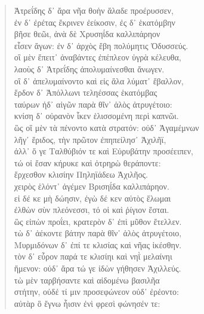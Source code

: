 \begin{Spacing}{1.5}
\begin{verse}
{\large\g Ἀτρεΐδης δ᾽ ἄρα νῆα θοὴν ἅλαδε προέρυσσεν,  } \\
{\large\g ἐν δ᾽ ἐρέτας ἔκρινεν ἐείκοσιν, ἐς δ᾽ ἑκατόμβην  } \\
{\large\g βῆσε θεῶι, ἀνὰ δὲ Χρυσηΐδα καλλιπάρηον  } \\
{\large\g εἷσεν ἄγων: ἐν δ᾽ ἀρχὸς ἔβη πολύμητις Ὀδυσσεύς.  } \\
{\large\g οἳ μὲν ἔπειτ᾽ ἀναβάντες ἐπέπλεον ὑγρὰ κέλευθα,  } \\
{\large\g λαοὺς δ᾽ Ἀτρεΐδης ἀπολυμαίνεσθαι ἄνωγεν.  } \\
{\large\g οἳ δ᾽ ἀπελυμαίνοντο καὶ εἰς ἅλα λύματ᾽ ἔβαλλον,  } \\
{\large\g ἕρδον δ᾽ Ἀπόλλωνι τεληέσσας ἑκατόμβας  } \\
{\large\g ταύρων ἠδ᾽ αἰγῶν παρὰ θῖν᾽ ἁλὸς ἀτρυγέτοιο:  } \\
{\large\g κνίση δ᾽ οὐρανὸν ἷκεν ἑλισσομένη περὶ καπνῶι.  } \\
{\large\g ὣς οἳ μὲν τὰ πένοντο κατὰ στρατόν: οὐδ᾽ Ἀγαμέμνων  } \\
{\large\g λῆγ᾽ ἔριδος, τὴν πρῶτον ἐπηπείλησ᾽ Ἀχιλῆϊ,  } \\
{\large\g ἀλλ᾽ ὅ γε Ταλθύβιόν τε καὶ Εὐρυβάτην προσέειπεν,  } \\
{\large\g τώ οἱ ἔσαν κήρυκε καὶ ὀτρηρὼ θεράποντε:  } \\
{\large\g ἔρχεσθον κλισίην Πηληϊάδεω Ἀχιλῆος.  } \\
{\large\g χειρὸς ἑλόντ᾽ ἀγέμεν Βρισηΐδα καλλιπάρηον.  } \\
{\large\g εἰ δέ κε μὴ δώησιν, ἐγὼ δέ κεν αὐτὸς ἕλωμαι  } \\
{\large\g ἐλθὼν σὺν πλεόνεσσι, τό οἱ καὶ ῥίγιον ἔσται.  } \\
{\large\g ὣς εἰπὼν προΐει, κρατερὸν δ᾽ ἐπὶ μῦθον ἔτελλεν.  } \\
{\large\g τὼ δ᾽ ἀέκοντε βάτην παρὰ θῖν᾽ ἁλὸς ἀτρυγέτοιο,  } \\
{\large\g Μυρμιδόνων δ᾽ ἐπί τε κλισίας καὶ νῆας ἱκέσθην.  } \\
{\large\g τὸν δ᾽ εὗρον παρά τε κλισίηι καὶ νηῒ μελαίνηι  } \\
{\large\g ἥμενον: οὐδ᾽ ἄρα τώ γε ἰδὼν γήθησεν Ἀχιλλεύς.  } \\
{\large\g τὼ μὲν ταρβήσαντε καὶ αἰδομένω βασιλῆα  } \\
{\large\g στήτην, οὐδέ τί μιν προσεφώνεον οὐδ᾽ ἐρέοντο:  } \\
{\large\g αὐτὰρ ὃ ἔγνω  ἧισιν ἐνὶ φρεσὶ φώνησέν τε:  } \\

\end{verse}
\end{Spacing}
